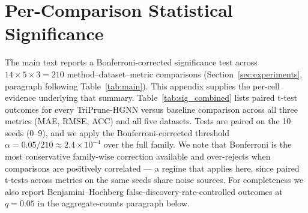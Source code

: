 \documentclass[10pt]{article}
\theoremstyle{plain}
\theoremstyle{definition}
\begin{document}
\section{Per-Comparison Statistical Significance}
\label{sec:significance}

The main text reports a Bonferroni-corrected significance test across $14\!\times\!5\!\times\!3 = 210$ method--dataset--metric comparisons (Section~\ref{sec:experiments}, paragraph following Table~\ref{tab:main}). This appendix supplies the per-cell evidence underlying that summary. Table~\ref{tab:sig_combined} lists paired t-test outcomes for every TriPrune-HGNN versus baseline comparison across all three metrics (MAE, RMSE, ACC) and all five datasets. Tests are paired on the 10 seeds (0--9), and we apply the Bonferroni-corrected threshold $\alpha=0.05/210\approx 2.4\!\times\!10^{-4}$ over the full family. We note that Bonferroni is the most conservative family-wise correction available and over-rejects when comparisons are positively correlated --- a regime that applies here, since paired t-tests across metrics on the same seeds share noise sources. For completeness we also report Benjamini--Hochberg false-discovery-rate-controlled outcomes at $q=0.05$ in the aggregate-counts paragraph below.
\end{document}
